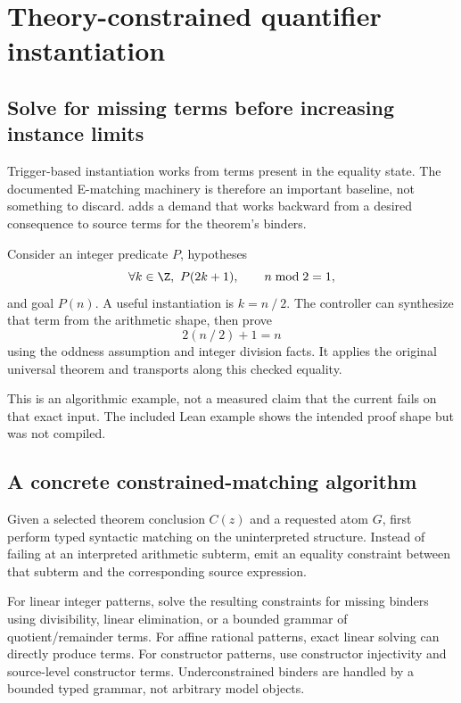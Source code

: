 \section{Theory-constrained quantifier instantiation}

\subsection{Solve for missing terms before increasing instance limits}

Trigger-based instantiation works from terms present in the equality state.
The documented E-matching machinery is therefore an important baseline, not
something to discard.\cite{grindematch} \Forge{} adds a demand that works
backward from a desired consequence to source terms for the theorem's binders.

Consider an integer predicate $P$, hypotheses
\[
\forall k\in\Z,\ P(2k+1),\qquad n\bmod2=1,
\]
and goal $P(n)$. A useful instantiation is $k=n\mathbin{/}2$. The controller
can synthesize that term from the arithmetic shape, then prove
\[
2(n\mathbin{/}2)+1=n
\]
using the oddness assumption and integer division facts. It applies the
original universal theorem and transports along this checked equality.

This is an algorithmic example, not a measured claim that the current
\Grind{} fails on that exact input. The included Lean example shows the
intended proof shape but was not compiled.

\subsection{A concrete constrained-matching algorithm}

Given a selected theorem conclusion $C(z)$ and a requested atom $G$, first
perform typed syntactic matching on the uninterpreted structure. Instead of
failing at an interpreted arithmetic subterm, emit an equality constraint
between that subterm and the corresponding source expression.

For linear integer patterns, solve the resulting constraints for missing
binders using divisibility, linear elimination, or a bounded grammar of
quotient/remainder terms. For affine rational patterns, exact linear solving
can directly produce terms. For constructor patterns, use constructor
injectivity and source-level constructor terms. Underconstrained binders are
handled by a bounded typed grammar, not arbitrary model objects.


